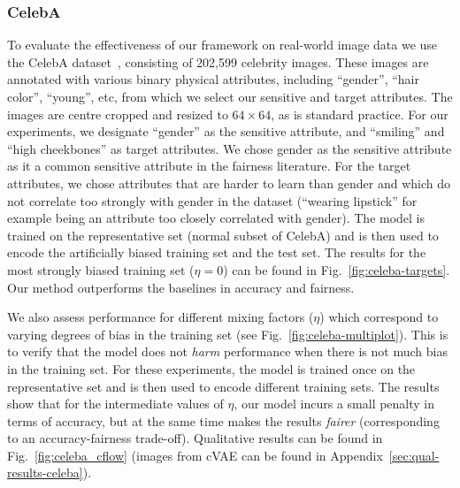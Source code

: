\subsubsection{CelebA}
To evaluate the effectiveness of our framework on real-world image data we use the CelebA dataset~\cite{liu2015faceattributes}, consisting of 202,599 celebrity images.
These images are annotated with various binary physical  attributes, including ``gender'', ``hair color'', ``young'', etc, from which we  select our sensitive and target attributes.
The images are centre cropped and resized to $64\times64$, as is standard practice.
For our experiments, we designate ``gender'' as the sensitive attribute,
and ``smiling'' and ``high cheekbones'' as target attributes.
We chose gender as the sensitive attribute as it a common sensitive attribute in the fairness literature.
For the target attributes, we chose attributes that are harder to learn than gender and which do not correlate too strongly with gender in the dataset
(``wearing lipstick'' for example being an attribute too closely correlated with gender).
The model is trained on the representative set (normal subset of CelebA)
and is then used to encode the artificially biased training set and the test set.
The results for the most strongly biased training set ($\eta=0$) can be found in Fig.~\ref{fig:celeba-targets}.
Our method outperforms the baselines in accuracy and fairness.

We also assess performance for different mixing factors ($\eta$) which correspond to varying degrees of bias in the training set
(see Fig.~\ref{fig:celeba-multiplot}).
This is to verify that the model does not \emph{harm} performance when there is not much bias in the training set.
For these experiments, the model is trained once on the representative set and is then used to encode different training sets.
The results show that for the intermediate values of $\eta$, our model incurs a small penalty in terms of accuracy,
but at the same time makes the results \emph{fairer} (corresponding to an accuracy-fairness trade-off). Qualitative results can be found in Fig.~\ref{fig:celeba_cflow} (images from cVAE can be found in Appendix~\ref{sec:qual-results-celeba}).


